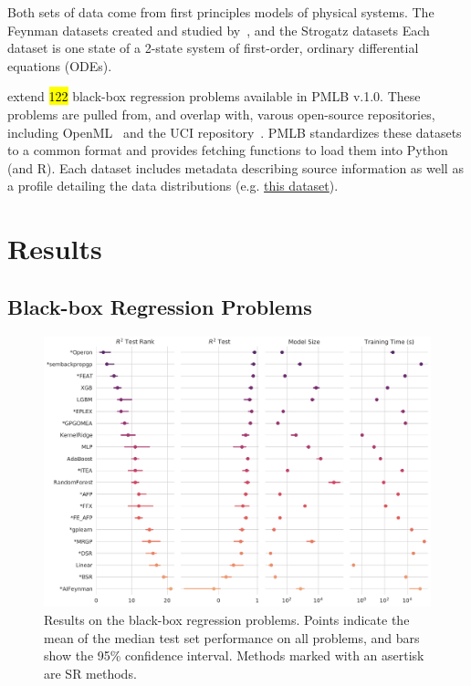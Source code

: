 Both sets of data come from first principles models of physical systems. 
The Feynman datasets created and studied by~\citet{udrescuAIFeynmanPhysicsInspired2020}, and the Strogatz datasets 
Each dataset is one state of a 2-state system of first-order, ordinary differential equations (ODEs). 

extend \hl{122} black-box regression problems available in PMLB v.1.0. 
These problems are pulled from, and overlap with, varous open-source repositories, including OpenML~\cite{vanschorenOpenMLNetworkedScience2013} and the UCI repository~\cite{lichmanUCIMachineLearning2013a}. 
PMLB standardizes these datasets to a common format and provides fetching functions to load them into Python (and R). 
Each dataset includes metadata describing source information as well as a profile detailing the data distributions (e.g. \href{https://epistasislab.github.io/pmlb/profile/analcatdata_aids.html}{this dataset}).

\section{Results}

\subsection{Black-box Regression Problems}
\begin{figure}
    \includegraphics[width=\textwidth]{figs/results_pmlb_r1/pairgrid-pointplot_r2_test_rank_r2_test_model_size_training-time-(s).pdf}
    \caption{ 
        Results on the black-box regression problems.
        Points indicate the mean of the median test set performance on all problems, and bars show the 95\% confidence interval. 
        Methods marked with an asertisk are SR methods. 
    }
    \label{fig:pmlb_perf}
\end{figure}

